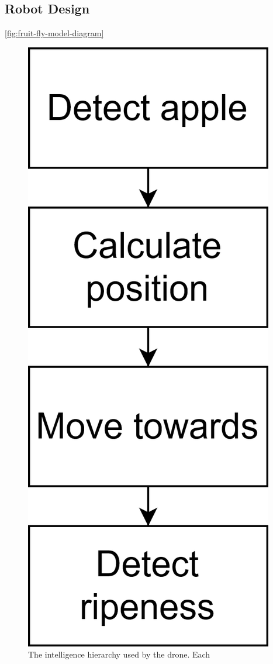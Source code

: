 \subsection{Robot Design}\label{subsec:robot-design}

\autoref{fig:fruit-fly-model-diagram}


\begin{figure}[htbp]
    \fontsize{7}{5}\selectfont
    \centering
    \includegraphics[maxwidth=\columnwidth,scale=0.75]
    {./figures/intelligence-hierarchy}
    \caption{
        The intelligence hierarchy used by the drone.
        Each 
    }
    \label{fig:intelligence-hierarchy}
\end{figure}

